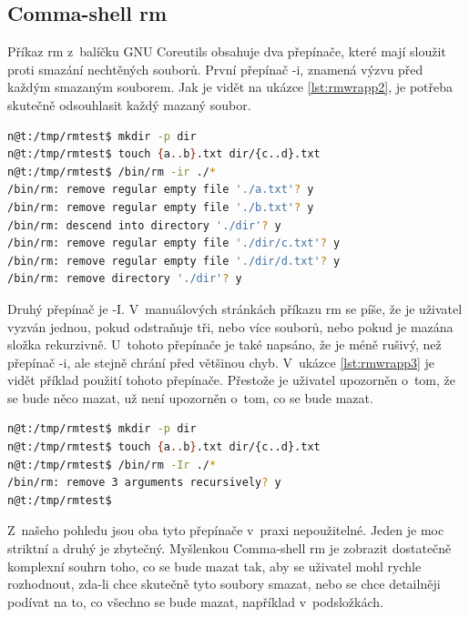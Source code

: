 \documentclass[thesis=M,czech]{FITthesis}[2012/06/26]
\begin{document}
%
\subsection{Comma-shell rm}

Příkaz rm z~balíčku GNU Coreutils obsahuje dva přepínače, které mají sloužit proti smazání nechtěných souborů. První přepínač -i, znamená výzvu před každým smazaným souborem. Jak je vidět na ukázce \ref{lst:rmwrapp2}, je potřeba skutečně odsouhlasit každý mazaný soubor.

\noindent
\begin{minipage}{\linewidth}
\begin{lstlisting}[language=bash, caption={rm}, label={lst:rmwrapp2}]
n@t:/tmp/rmtest$ mkdir -p dir
n@t:/tmp/rmtest$ touch {a..b}.txt dir/{c..d}.txt
n@t:/tmp/rmtest$ /bin/rm -ir ./*
/bin/rm: remove regular empty file './a.txt'? y
/bin/rm: remove regular empty file './b.txt'? y
/bin/rm: descend into directory './dir'? y
/bin/rm: remove regular empty file './dir/c.txt'? y
/bin/rm: remove regular empty file './dir/d.txt'? y
/bin/rm: remove directory './dir'? y
\end{lstlisting}
\end{minipage}

Druhý přepínač je -I. V~manuálových stránkách příkazu rm se píše, že je uživatel vyzván jednou, pokud odstraňuje tři, nebo více souborů, nebo pokud je mazána složka rekurzivně. U~tohoto přepínače je také napsáno, že je méně rušivý, než přepínač -i, ale stejně chrání před většinou chyb. V~ukázce \ref{lst:rmwrapp3} je vidět příklad použití tohoto přepínače. Přestože je uživatel upozorněn o~tom, že se bude něco mazat, už není upozorněn o~tom, co se bude mazat.

\noindent
\begin{minipage}{\linewidth}
\begin{lstlisting}[language=bash, caption={rm s~}, label={lst:rmwrapp3}]
n@t:/tmp/rmtest$ mkdir -p dir
n@t:/tmp/rmtest$ touch {a..b}.txt dir/{c..d}.txt
n@t:/tmp/rmtest$ /bin/rm -Ir ./*
/bin/rm: remove 3 arguments recursively? y
n@t:/tmp/rmtest$
\end{lstlisting}
\end{minipage}

Z~našeho pohledu jsou oba tyto přepínače v~praxi nepoužitelné. Jeden je moc striktní a druhý je zbytečný. Myšlenkou Comma-shell rm je zobrazit dostatečně komplexní souhrn toho, co se bude mazat tak, aby se uživatel mohl rychle rozhodnout, zda-li chce skutečně tyto soubory smazat, nebo se chce detailněji podívat na to, co všechno se bude mazat, například v~podsložkách.
\end{document}
